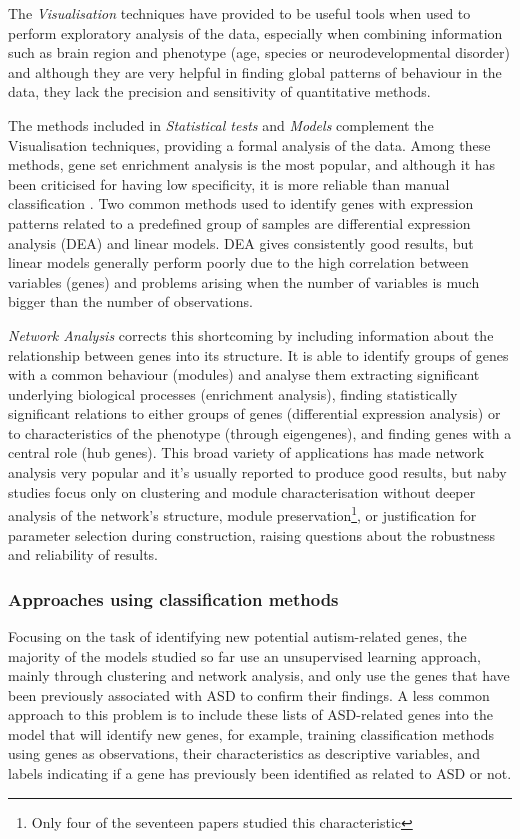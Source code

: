 The \textit{Visualisation} techniques have provided to be useful tools when used to perform exploratory analysis of the data, especially when combining information such as brain region and phenotype (age, species or neurodevelopmental disorder) and although they are very helpful in finding global patterns of behaviour in the data, they lack the precision and sensitivity of quantitative methods.

The methods included in \textit{Statistical tests} and \textit{Models} complement the Visualisation techniques, providing a formal analysis of the data. Among these methods, gene set enrichment analysis is the most popular, and although it has been criticised for having low specificity, it is more reliable than manual classification \cite{garbett_immune_2008}. Two common methods used to identify genes with expression patterns related to a predefined group of samples are differential expression analysis (DEA) and linear models. DEA gives consistently good results, but linear models generally perform poorly due to the high correlation between variables (genes) and problems arising when the number of variables is much bigger than the number of observations.

\textit{Network Analysis} corrects this shortcoming by including information about the relationship between genes into its structure. It is able to identify groups of genes with a common behaviour (modules) and analyse them extracting significant underlying biological processes (enrichment analysis), finding statistically significant relations to either groups of genes (differential expression analysis) or to characteristics of the phenotype (through eigengenes), and finding genes with a central role (hub genes). This broad variety of applications has made network analysis very popular and it's usually reported to produce good results, but naby studies focus only on clustering and module characterisation without deeper analysis of the network's structure, module preservation\footnote{Only four of the seventeen papers studied this characteristic}, or justification for parameter selection during construction, raising questions about the robustness and reliability of results.

\subsubsection{Approaches using classification methods}
Focusing on the task of identifying new potential autism-related genes, the majority of the models studied so far use an unsupervised learning approach, mainly through clustering and network analysis, and only use the genes that have been previously associated with ASD to confirm their findings. A less common approach to this problem is to include these lists of ASD-related genes into the model that will identify new genes, for example, training classification methods using genes as observations, their characteristics as descriptive variables, and labels indicating if a gene has previously been identified as related to ASD or not.

